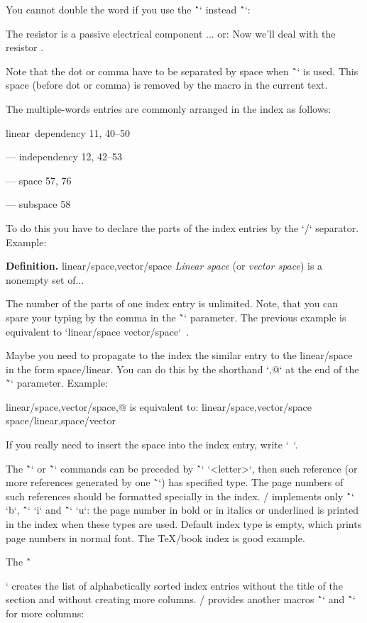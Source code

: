 {You cannot double the word if you use the \^`\iid` instead \^`\ii`:

\begtt
The \iid resistor is a passive electrical component ...
or:
Now we'll deal with the \iid resistor .
\endtt

Note that the dot or comma have to be separated by space when \^`\iid` is
used. This space (before dot or comma) is removed by the macro in 
the current text.

The multiple-words entries are commonly arranged in the index as follows:

\medskip

linear~dependency  11, 40--50

--- independency 12, 42--53

--- space 57, 76

--- subspace 58

\medskip

To do this you have to declare the parts of the index entries by the `/` separator.
Example:

\begtt
{\bf Definition.}
\ii linear/space,vector/space
{\em Linear space} (or {\em vector space}) is a nonempty set of...
\endtt

The number of the parts of one index entry is unlimited. Note, that you can
spare your typing by the comma in the \~`\ii` parameter. The previous example
is equivalent to `\ii linear/space \ii vector/space`~.

Maybe you need to propagate to the index the similar entry to the
linear/space in the form space/linear. You can do this by the shorthand `,@`
at the end of the \~`\ii` parameter. Example:

\begtt
\ii linear/space,vector/space,@
is equivalent to:
\ii linear/space,vector/space \ii space/linear,space/vector
\endtt

If you really need to insert the space into the index entry, write `~`.

The \~`\ii` or \~`\iid` commands can be preceded by \^`\iitype` `<letter>`, then such
reference (or more references generated by one \~`\ii`) has specified type.
The page numbers of such references should be formatted
specially in the index. \OpTeX/ implements only \^`\iitype` `b`, 
\^`\iitype` `i` and \^`\iitype` `u`: 
the page number in bold or in italics or underlined is printed
in the index when these types are used. Default index type is empty, which
prints page numbers in normal font. The \TeX/book index is good example.

The \^`\makeindex` creates the list of alphabetically sorted index entries
without the title of the section and without creating more columns. \OpTeX/
provides another macros \^`\begmulti` and \^`\endmulti` for more columns: 

}
